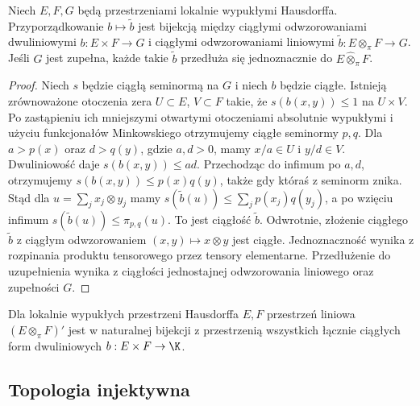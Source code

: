\begin{twierdzenie}
\label{thm:pi-universal24}
Niech $E,F,G$ będą przestrzeniami lokalnie wypukłymi
Hausdorffa. Przyporządkowanie $b\mapsto\widetilde b$ jest bijekcją
między ciągłymi odwzorowaniami dwuliniowymi
$b:E\times F\to G$ i ciągłymi odwzorowaniami liniowymi
$\widetilde b:E\otimes_\pi F\to G$. Jeśli $G$ jest
zupełna, każde takie $\widetilde b$ przedłuża się jednoznacznie
do $E\widehat\otimes_\pi F$.
\end{twierdzenie}
\begin{proof}
Niech $s$ będzie ciągłą seminormą na $G$ i niech $b$
będzie ciągłe. Istnieją zrównoważone otoczenia zera
$U\subset E$, $V\subset F$ takie, że $s(b(x,y))\le1$
na $U\times V$. Po zastąpieniu ich mniejszymi otwartymi
otoczeniami absolutnie wypukłymi i użyciu funkcjonałów
Minkowskiego otrzymujemy ciągłe seminormy $p,q$.
Dla $a>p(x)$ oraz $d>q(y)$, gdzie $a,d>0$,
mamy $x/a\in U$ i $y/d\in V$.
Dwuliniowość daje $s(b(x,y))\le ad$.
Przechodząc do infimum po $a,d$, otrzymujemy
$s(b(x,y))\le p(x)q(y)$, także gdy któraś
z seminorm znika. Stąd dla $u=\sum_jx_j\otimes y_j$ mamy
$s(\widetilde b(u))\le\sum_jp(x_j)q(y_j)$,
a po wzięciu infimum $s(\widetilde b(u))\le\pi_{p,q}(u)$.
To jest ciągłość $\widetilde b$. Odwrotnie, złożenie
ciągłego $\widetilde b$ z ciągłym odwzorowaniem
$(x,y)\mapsto x\otimes y$ jest ciągłe.
Jednoznaczność wynika z rozpinania produktu tensorowego
przez tensory elementarne. Przedłużenie do uzupełnienia
wynika z ciągłości jednostajnej odwzorowania liniowego
oraz zupełności $G$.
\end{proof}

\begin{wniosek}
\label{cor:pi-dual24}
Dla lokalnie wypukłych przestrzeni Hausdorffa $E,F$
przestrzeń liniowa $(E\otimes_\pi F)'$ jest w naturalnej
bijekcji z przestrzenią wszystkich łącznie ciągłych form
dwuliniowych $b:E\times F\to\K$.
\end{wniosek}

\subsection{Topologia injektywna}

